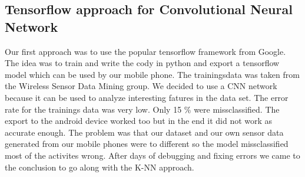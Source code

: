 \documentclass[conference]{IEEEtran}
\begin{document}
\subsection{Tensorflow approach for Convolutional Neural Network}
Our first approach was to use the popular tensorflow framework from Google. The idea was to train and write the cody in python and export a tensorflow model which can be used by our mobile phone. The trainingsdata was taken from the Wireless Sensor Data Mining group\cite{b1}. We decided to use a CNN network because it can be used to analyze interesting fatures in the data set. The error rate for the trainings data was very low. Only 15 \% were missclassified. The export to the android device worked too but in the end it did not work as accurate enough. The problem was that our dataset and our own sensor data generated from our mobile phones were to different so the model missclassified most of the activites wrong. After days of debugging and fixing errors we came to the conclusion to go along with the K-NN approach\cite{b2}.
\end{document}
